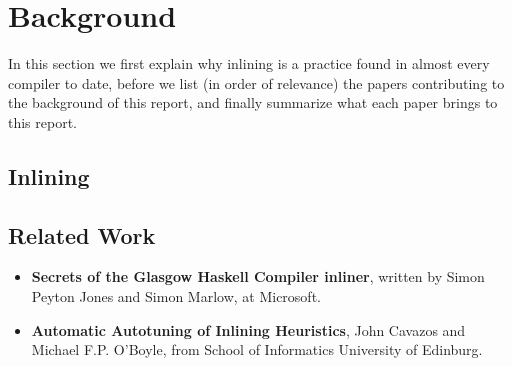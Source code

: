 \section{Background}

In this section we first explain why inlining is a practice found in almost
every compiler to date, before we list (in order of relevance) the
papers contributing to the background of this report, and finally summarize what
each paper brings to this report.

\subsection{Inlining}

\subsection{Related Work}


\begin{itemize}
	\item \textbf{Secrets of the Glasgow Haskell Compiler inliner}, written by
	Simon Peyton Jones and Simon Marlow, at Microsoft. \\

	\item \textbf{Automatic Autotuning of Inlining Heuristics}, John Cavazos and
	Michael F.P. O'Boyle, from School of Informatics University of Edinburg. \\

\end{itemize}
